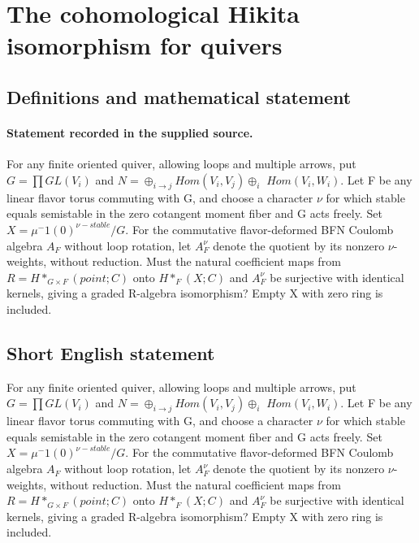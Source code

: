 \documentclass[11pt]{article}
\begin{document}
\section*{The cohomological Hikita isomorphism for quivers}\label{30007021}
\subsection{Definitions and mathematical statement}
\paragraph{Statement recorded in the supplied source.}
For any finite oriented quiver, allowing loops and multiple arrows, put $G=\prod GL(V_i)$ and $N=\oplus _{i\to j}Hom(V_i,V_j)\oplus _i$ $Hom(V_i,W_i)$. Let F be any linear flavor torus commuting with G, and choose a character $\nu $ for which stable equals semistable in the zero cotangent moment fiber and G acts freely. Set $X=\mu ^-1(0)^{\nu -stable}/G$. For the commutative flavor-deformed BFN Coulomb algebra $A_F$ without loop rotation, let $A_F^\nu $ denote the quotient by its nonzero $\nu$-weights, without reduction. Must the natural coefficient maps from $R=H*_{G×F}(point;C)$ onto $H*_F(X;C)$ and $A_F^\nu $ be surjective with identical kernels, giving a graded R-algebra isomorphism? Empty X with zero ring is included.
\subsection{Short English statement}
For any finite oriented quiver, allowing loops and multiple arrows, put $G=\prod GL(V_i)$ and $N=\oplus _{i\to j}Hom(V_i,V_j)\oplus _i$ $Hom(V_i,W_i)$. Let F be any linear flavor torus commuting with G, and choose a character $\nu $ for which stable equals semistable in the zero cotangent moment fiber and G acts freely. Set $X=\mu ^-1(0)^{\nu -stable}/G$. For the commutative flavor-deformed BFN Coulomb algebra $A_F$ without loop rotation, let $A_F^\nu $ denote the quotient by its nonzero $\nu$-weights, without reduction. Must the natural coefficient maps from $R=H*_{G×F}(point;C)$ onto $H*_F(X;C)$ and $A_F^\nu $ be surjective with identical kernels, giving a graded R-algebra isomorphism? Empty X with zero ring is included.
\end{document}
